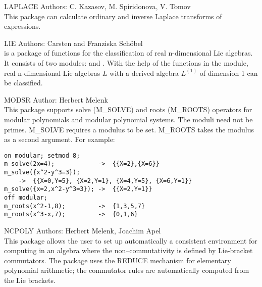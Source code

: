 \begin{Package}{LAPLACE}
Authors: C. Kazasov, M. Spiridonova, V. Tomov\\

This package can calculate ordinary and inverse Laplace transforms of
expressions.
\end{Package}

\begin{Package}{LIE}
Authors: Carsten and Franziska Sch{\"o}bel\\

 is a package of functions for the classification of real
n-dimensional Lie algebras.  It consists of two modules: 
and .  With the help of the functions in the 
module, real n-dimensional Lie algebras $L$ with a derived algebra
$L^{(1)}$ of dimension 1 can be classified.
\end{Package}

\begin{Package}{MODSR}
Author: Herbert Melenk\\

This package supports solve (M\_SOLVE) and roots (M\_ROOTS) operators for
modular polynomials and modular polynomial systems.  The moduli need not
be primes. M\_SOLVE requires a modulus to be set.  M\_ROOTS takes the
modulus as a second argument. For example:

\begin{verbatim}
on modular; setmod 8;
m_solve(2x=4);            ->  {{X=2},{X=6}}
m_solve({x^2-y^3=3});
    ->  {{X=0,Y=5}, {X=2,Y=1}, {X=4,Y=5}, {X=6,Y=1}}
m_solve({x=2,x^2-y^3=3}); ->  {{X=2,Y=1}}
off modular;
m_roots(x^2-1,8);         ->  {1,3,5,7}
m_roots(x^3-x,7);         ->  {0,1,6}
\end{verbatim}
\end{Package}

\begin{Package}{NCPOLY}
Authors: Herbert Melenk, Joachim Apel\\

This package allows the user to set up automatically a consistent
environment for computing in an algebra where the non--commutativity is
defined by Lie-bracket commutators.  The package uses the REDUCE
 mechanism for elementary polynomial arithmetic; the commutator
rules are automatically computed from the Lie brackets.
\end{Package}

